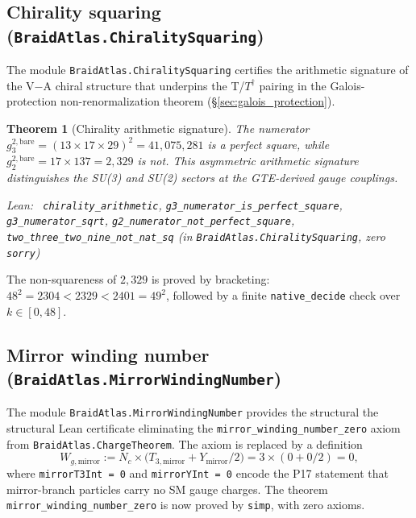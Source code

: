 \documentclass[11pt,a4paper]{article}
\newenvironment{leanref}%
  {\par\smallskip\noindent\begingroup\raggedright\textup{Lean:}~}%
  {\par\endgroup}
\newtheorem{theorem}{Theorem}[section]
\theoremstyle{definition}
\begin{document}
\subsection{Chirality squaring (\texttt{BraidAtlas.ChiralitySquaring})}
\label{subsec:chirality_squaring_lean}

The module \texttt{BraidAtlas.ChiralitySquaring} certifies the arithmetic
signature of the V$-$A chiral structure that underpins the
T/$T^\dagger$ pairing in the Galois-protection non-renormalization theorem
(\S\ref{sec:galois_protection}).

\begin{theorem}[Chirality arithmetic signature]\label{thm:chirality_arithmetic}
The numerator $g_3^{2,\mathrm{bare}} = (13 \times 17 \times 29)^2 = 41{,}075{,}281$
is a perfect square, while $g_2^{2,\mathrm{bare}} = 17 \times 137 = 2{,}329$
is not.  This asymmetric arithmetic signature distinguishes the SU(3) and
SU(2) sectors at the GTE-derived gauge couplings.
\begin{leanref}
\lstinline|chirality_arithmetic|,
\lstinline|g3_numerator_is_perfect_square|,
\lstinline|g3_numerator_sqrt|,
\lstinline|g2_numerator_not_perfect_square|,
\lstinline|two_three_two_nine_not_nat_sq|
\textup{(in \texttt{BraidAtlas.ChiralitySquaring}, zero \texttt{sorry})}
\end{leanref}
\end{theorem}

The non-squareness of $2{,}329$ is proved by bracketing: $48^2 = 2304 < 2329 < 2401 = 49^2$,
followed by a finite \lstinline|native_decide| check over $k \in [0, 48]$.

\subsection{Mirror winding number (\texttt{BraidAtlas.MirrorWindingNumber})}
\label{subsec:mirror_winding_lean}

The module \texttt{BraidAtlas.MirrorWindingNumber} provides the structural
the structural Lean certificate eliminating the \lstinline|mirror_winding_number_zero|
axiom from \texttt{BraidAtlas.ChargeTheorem}.
The axiom is replaced by a definition
\[
  W_{g,\text{mirror}} := N_c \times \bigl(T_{3,\text{mirror}} + Y_{\text{mirror}}/2\bigr)
  = 3 \times (0 + 0/2) = 0,
\]
where \lstinline|mirrorT3Int = 0| and \lstinline|mirrorYInt = 0| encode the
P17 statement that mirror-branch particles carry no SM gauge charges.
The theorem \lstinline|mirror_winding_number_zero| is now proved by \lstinline|simp|,
with zero axioms.
\end{document}
